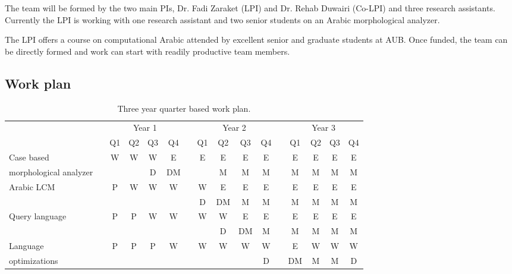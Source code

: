 \documentclass[12pt]{article}
\begin{document}
The team will be formed by the two main PIs, Dr. Fadi Zaraket (LPI)
and Dr. Rehab Duwairi (Co-LPI) and three research assistants.
Currently the LPI is working with one research assistant 
and two senior students on an Arabic morphological analyzer. 

The LPI offers a course on computational Arabic attended
by excellent senior and graduate students at AUB. 
Once funded, the team can be directly formed and work can start
with readily productive team members. 

\subsection{Work plan}
\label{s:design:plan}


\begin{table}[bt]
\centering
\caption{Three year quarter based work plan.}
\small
\begin{tabular}{lp{.1cm}ccccp{.1cm}ccccp{.1cm}cccc} \\
& & \multicolumn{4}{c}{Year 1} & & \multicolumn{4}{c}{Year 2} & & \multicolumn{4}{c}{Year 3} \\ \cline{3-6} \cline{8-11} \cline{13-16} %
& & Q1 & Q2 & Q3 & Q4 & & Q1 & Q2 & Q3 & Q4 & & Q1 & Q2 & Q3 & Q4 \\ \bottomrule

Case based & & 
W & W & W & E & & E & E & E & E & & E & E & E & E \\ 
morphological analyzer & & 
 &  & D & DM & &   & M & M & M & & M & M & M & M \\  \hline

\multirow{2}{*}{Arabic LCM} & & 
P & W & W & W & & W & E & E & E & & E & E & E & E \\ 
& & 
 &  &  &  & & D & DM & M & M & & M & M & M & M \\ \hline

\multirow{2}{*}{Query language} & & 
P & P & W & W & & W & W & E & E & & E & E & E & E \\ 
& & 
  &  &  &  & &  & D & DM & M & & M & M & M & M \\ \hline

Language & & 
P & P & P & W & & W & W & W & W & & E & W & W & W \\ 
optimizations & & 
 &  &  &  & &  &  &  & D & & DM & M & M & D \\ \hline


\end{tabular}
\end{table}
\end{document}
